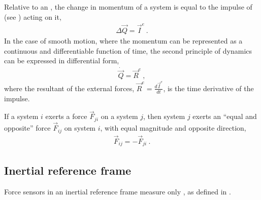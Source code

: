 \documentclass[letterpaper,10pt,english]{jupyterBook}
\begin{document}
\sphinxAtStartPar
{} Relative to an {\hyperref[\detokenize{ch/dynamics-principles:classical-mehcanics-dynamics-principles-inertial-ref-frame}]{}}, the change in momentum of a system is equal to the impulse of  (see {\hyperref[\detokenize{ch/actions:def:true-forces}]{}}) acting on it,
\begin{equation*}
\begin{split}\Delta \vec{Q} = \vec{I}^e \ .\end{split}
\end{equation*}
\sphinxAtStartPar
In the case of smooth motion, where the momentum can be represented as a continuous and differentiable function of time, the second principle of dynamics can be expressed in differential form,
\begin{equation*}
\begin{split}\dot{\vec{Q}} = \vec{R}^e \ ,\end{split}
\end{equation*}
\sphinxAtStartPar
where the resultant of the external forces, \(\vec{R}^e = \frac{d \vec{I}^e}{dt}\), is the time derivative of the impulse.

\sphinxAtStartPar
{} If a system \(i\) exerts a force \(\vec{F}_{ji}\) on a system \(j\), then system \(j\) exerts an “equal and opposite” force \(\vec{F}_{ij}\) on system \(i\), with equal magnitude and opposite direction,
\begin{equation*}
\begin{split}\vec{F}_{ij} = - \vec{F}_{ji} \ .\end{split}
\end{equation*}

\subsection{Inertial reference frame}
\label{\detokenize{ch/dynamics-principles:inertial-reference-frame}}\label{\detokenize{ch/dynamics-principles:classical-mehcanics-dynamics-principles-inertial-ref-frame}}
\sphinxAtStartPar
Force sensors in an inertial reference frame measure only , as defined in {\hyperref[\detokenize{ch/actions:def:true-forces}]{}}.
\end{document}
